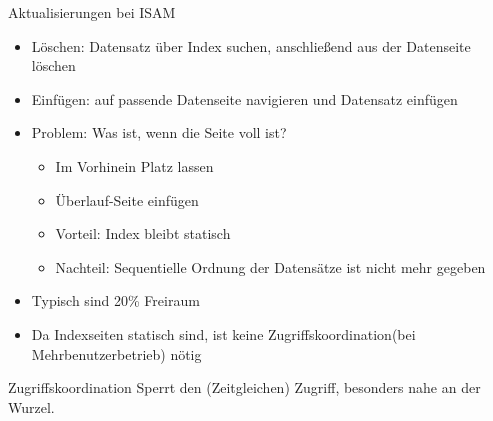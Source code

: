 \documentclass{article}
\begin{document}
\begin{block}{Aktualisierungen bei ISAM}
  \begin{itemize}
    \item Löschen: Datensatz über Index suchen, anschließend aus der Datenseite löschen
    \item Einfügen: auf passende Datenseite navigieren und Datensatz einfügen
    \item Problem: Was ist, wenn die Seite voll ist?
    \begin{itemize}
      \item Im Vorhinein Platz lassen
      \item Überlauf-Seite einfügen
      \item Vorteil: Index bleibt statisch
      \item Nachteil: Sequentielle Ordnung der Datensätze ist nicht mehr gegeben
    \end{itemize}
    \item Typisch sind 20\% Freiraum
    \item Da Indexseiten statisch sind, ist keine Zugriffskoordination(bei Mehrbenutzerbetrieb) nötig
  \end{itemize}
\end{block}

\begin{block}{Zugriffskoordination}
  Sperrt den (Zeitgleichen) Zugriff, besonders nahe an der Wurzel.
\end{block}
\end{document}
